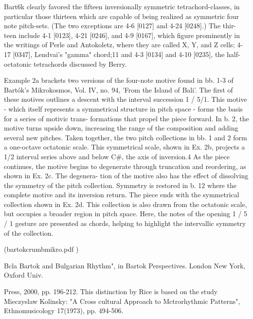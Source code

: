 \documentclass[
	12pt,				%
	openright,			%
	twoside,			%
	a4paper,			%
	english,			%
	french,				%
	spanish,			%
	brazil				%
	]{abntex2}
\begin{document}
Bart6k clearly favored the fifteen inversionally
symmetric tetrachord-classes, in particular those thirteen which
are capable of being realized as symmetric four note pitch-sets.
(The two exceptions are 4-6 [0127] and 4-24 [0248].) The thir-
teen include 4-1 [0123], 4-21 [0246], and 4-9 [0167], which figure
prominently in the writings of Perle and Antokoletz, where
they are called X, Y, and Z cells; 4-17 [0347], Lendvai's
"gamma" chord;11 and 4-3 [0134] and 4-10 [0235], the half-
octatonic tetrachords discussed by Berry.




Example 2a brackets two versions of the four-note motive found in
bb. 1-3 of Bartók's Mikrokosmos, Vol. IV, no. 94, 'From the Island of
Bali'. The first of these motives outlines a descent with the interval
succession 1 / 5/1. This motive - which itself represents a symmetrical
structure in pitch space - forms the basis for a series of motivic trans-
formations that propel the piece forward. In b. 2, the motive turns
upside down, increasing the range of the composition and adding
several new pitches. Taken together, the two pitch collections in bb. 1
and 2 form a one-octave octatonic scale. This symmetrical scale, shown
in Ex. 2b, projects a 1/2 interval series above and below C\#, the axis of
inversion.4 As the piece continues, the motive begins to degenerate
through truncation and reordering, as shown in Ex. 2c. The degenera-
tion of the motive also has the effect of dissolving the symmetry of the
pitch collection. Symmetry is restored in b. 12 where the complete
motive and its inversion return. The piece ends with the symmetrical
collection shown in Ex. 2d. This collection is also drawn from the
octatonic scale, but occupies a broader region in pitch space. Here, the
notes of the opening 1 / 5 / 1 gesture are presented as chords, helping to
highlight the intervallic symmetry of the collection.

 (bartokcrumbmikro.pdf )









Bcla Bartok and
Bulgarian Rhythm", in Bartok Perspectives.
London New York, Oxford Univ.

Press, 2000, pp. 196-212. This distinction by Rice is based on the study Mieczyslaw
Kolinsky: "A Cross
cultural Approach to Mctrorhythmic Patterns", Ethnomusicology
17(1973), pp. 494-506.
\end{document}
